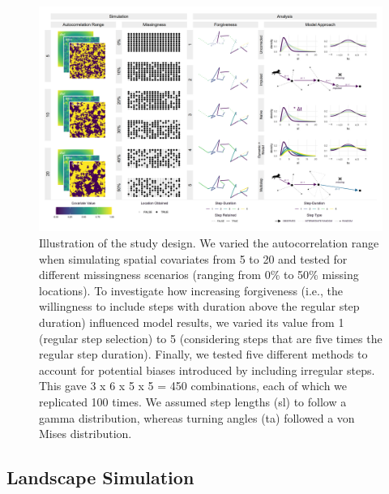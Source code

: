 \documentclass[abstract=on,10pt,a4paper,bibliography=totocnumbered]{article}
\begin{document}
\begin{figure}
  \begin{center}
  \includegraphics[width = \textwidth]{99_Design.png}
  \caption{Illustration of the study design. We varied the autocorrelation range
  when simulating spatial covariates from 5 to 20 and tested for different
  missingness scenarios (ranging from 0\% to 50\% missing locations). To
  investigate how increasing forgiveness (i.e., the willingness to include steps
  with duration above the regular step duration) influenced model results, we
  varied its value from 1 (regular step selection) to 5 (considering steps that
  are five times the regular step duration). Finally, we tested five different
  methods to account for potential biases introduced by including irregular
  steps. This gave 3 x 6 x 5 x 5 = 450 combinations, each of which we replicated
  100 times. We assumed step lengths (sl) to follow a gamma distribution,
  whereas turning angles (ta) followed a von Mises distribution.}
  \label{Design}
  \end{center}
\end{figure}

\subsection{Landscape Simulation}
\end{document}
